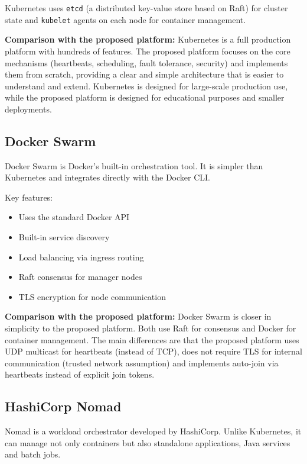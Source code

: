 Kubernetes uses \texttt{etcd} (a distributed key-value store based on Raft) for cluster state and \texttt{kubelet} agents on each node for container management.

\textbf{Comparison with the proposed platform:} Kubernetes is a full production platform with hundreds of features. The proposed platform focuses on the core mechanisms (heartbeats, scheduling, fault tolerance, security) and implements them from scratch, providing a clear and simple architecture that is easier to understand and extend. Kubernetes is designed for large-scale production use, while the proposed platform is designed for educational purposes and smaller deployments.

\subsection{Docker Swarm}

Docker Swarm \cite{misc:web:docker:swarm} is Docker's built-in orchestration tool. It is simpler than Kubernetes and integrates directly with the Docker CLI.

Key features:
\begin{itemize}
    \item Uses the standard Docker API
    \item Built-in service discovery
    \item Load balancing via ingress routing
    \item Raft consensus for manager nodes
    \item TLS encryption for node communication
\end{itemize}

\textbf{Comparison with the proposed platform:} Docker Swarm is closer in simplicity to the proposed platform. Both use Raft for consensus and Docker for container management. The main differences are that the proposed platform uses UDP multicast for heartbeats (instead of TCP), does not require TLS for internal communication (trusted network assumption) and implements auto-join via heartbeats instead of explicit join tokens.

\subsection{HashiCorp Nomad}

Nomad \cite{misc:web:nomad} is a workload orchestrator developed by HashiCorp. Unlike Kubernetes, it can manage not only containers but also standalone applications, Java services and batch jobs.

